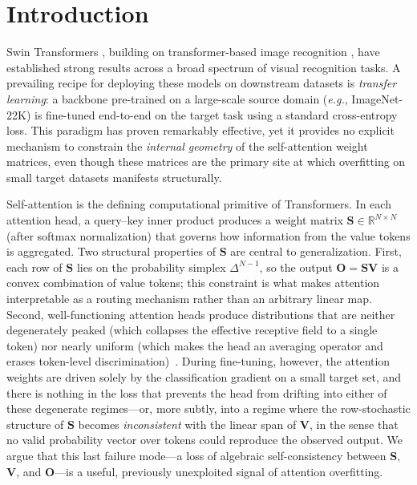 \documentclass[review,12pt,authoryear]{elsarticle}
\begin{document}
\section{Introduction}
\label{sec:intro}

Swin Transformers \citep{liu2021swin}, building on transformer-based image recognition \citep{dosovitskiy2021an}, have established strong results across a broad spectrum of visual recognition tasks.
A prevailing recipe for deploying these models on downstream datasets is \emph{transfer learning}: a backbone pre-trained on a large-scale source domain (\emph{e.g.}, ImageNet-22K) is fine-tuned end-to-end on the target task using a standard cross-entropy loss.
This paradigm has proven remarkably effective, yet it provides no explicit mechanism to constrain the \emph{internal geometry} of the self-attention weight matrices, even though these matrices are the primary site at which overfitting on small target datasets manifests structurally.

Self-attention is the defining computational primitive of Transformers.
In each attention head, a query--key inner product produces a weight matrix $\mathbf{S} \in \mathbb{R}^{N \times N}$ (after softmax normalization) that governs how information from the value tokens is aggregated.
Two structural properties of $\mathbf{S}$ are central to generalization. First, each row of $\mathbf{S}$ lies on the probability simplex $\Delta^{N-1}$, so the output $\mathbf{O} = \mathbf{S}\mathbf{V}$ is a convex combination of value tokens; this constraint is what makes attention interpretable as a routing mechanism rather than an arbitrary linear map. Second, well-functioning attention heads produce distributions that are neither degenerately peaked (which collapses the effective receptive field to a single token) nor nearly uniform (which makes the head an averaging operator and erases token-level discrimination)~\citep{niu2021attention,zhang2024accvit}.
During fine-tuning, however, the attention weights are driven solely by the classification gradient on a small target set, and there is nothing in the loss that prevents the head from drifting into either of these degenerate regimes---or, more subtly, into a regime where the row-stochastic structure of $\mathbf{S}$ becomes \emph{inconsistent} with the linear span of $\mathbf{V}$, in the sense that no valid probability vector over tokens could reproduce the observed output. We argue that this last failure mode---a loss of algebraic self-consistency between $\mathbf{S}$, $\mathbf{V}$, and $\mathbf{O}$---is a useful, previously unexploited signal of attention overfitting.
\end{document}
